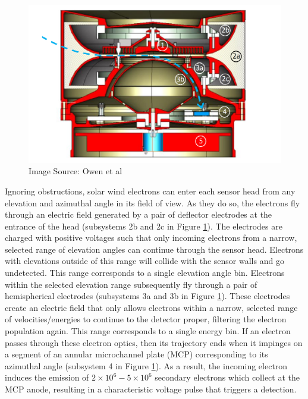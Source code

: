 \begin{figure}[h!]
    \centering
    \centerfloat
    \includegraphics[width=0.85\linewidth]{figures/eas_cross-section.png}
    \caption{A diagram showing a cross-section of an EAS sensor head with an example electron trajectory illustrated in blue, and the following annotated subsystems\cite{owen2020}: (1) “top-cap” anode for controlling the geometric factor; (2) (a) sensor shielding grid; (2) (b,c) deflector electrodes for elevation selection; (3) (a,b) hemispherical electrodes for energy selection; (4) MCP subsystem; (5) charge amplifier integrated circuit.}
    \caption*{Image Source: Owen et al\cite{owen2020}}
    \label{fig: EAS cross-section}
\end{figure}

Ignoring obstructions, solar wind electrons can enter each sensor head from any elevation and azimuthal angle in its field of view. As they do so, the electrons fly through an electric field generated by a pair of deflector electrodes at the entrance of the head (subsystems 2b and 2c in Figure \ref{fig: EAS cross-section}). The electrodes are charged with positive voltages such that only incoming electrons from a narrow, selected range of elevation angles can continue through the sensor head. Electrons with elevations outside of this range will collide with the sensor walls and go undetected. This range corresponds to a single elevation angle bin. Electrons within the selected elevation range subsequently fly through a pair of hemispherical electrodes (subsystems 3a and 3b in Figure \ref{fig: EAS cross-section}). These electrodes create an electric field that only allows electrons within a narrow, selected range of velocities/energies to continue to the detector proper, filtering the electron population again. This range corresponds to a single energy bin. If an electron passes through these electron optics, then its trajectory ends when it impinges on a segment of an annular microchannel plate (MCP) corresponding to its azimuthal angle (subsystem 4 in Figure \ref{fig: EAS cross-section}). As a result, the incoming electron induces the emission of \(2\times10^{6}-5\times10^{6}\) secondary electrons which collect at the MCP anode, resulting in a characteristic voltage pulse that triggers a detection\cite{owen2020}.
\\

